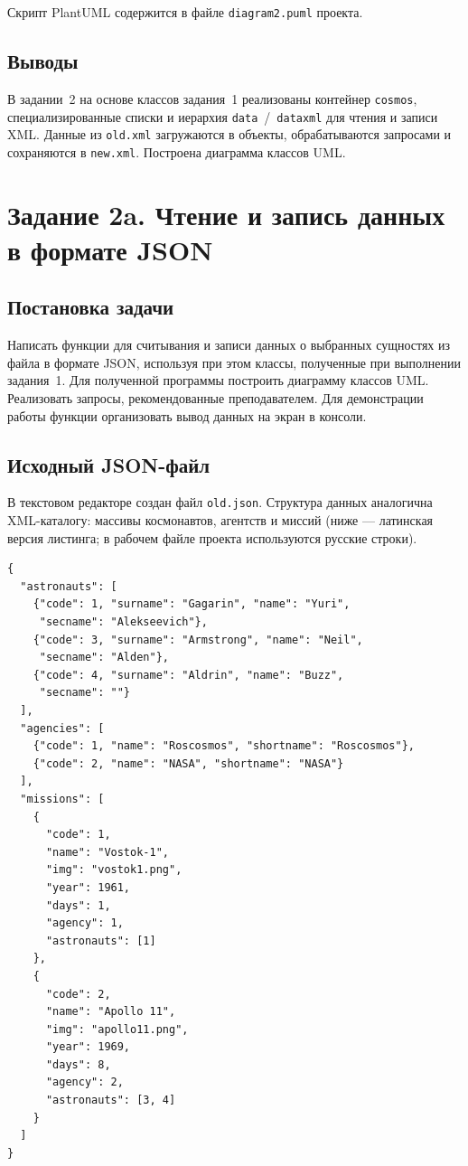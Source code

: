 \documentclass[a4paper,14pt]{extarticle}
\begin{document}
Скрипт PlantUML содержится в файле \texttt{diagram2.puml} проекта.

\subsection{Выводы}

В задании~2 на основе классов задания~1 реализованы контейнер \texttt{cosmos}, специализированные списки и иерархия \texttt{data}~/~\texttt{dataxml} для чтения и записи XML. Данные из \texttt{old.xml} загружаются в объекты, обрабатываются запросами и сохраняются в \texttt{new.xml}. Построена диаграмма классов UML.

\clearpage
\section{Задание 2a. Чтение и запись данных в формате JSON}

\subsection{Постановка задачи}

Написать функции для считывания и записи данных о выбранных сущностях из файла в формате JSON, используя при этом классы, полученные при выполнении задания~1. Для полученной программы построить диаграмму классов UML. Реализовать запросы, рекомендованные преподавателем. Для демонстрации работы функции организовать вывод данных на экран в консоли.

\subsection{Исходный JSON-файл}

В текстовом редакторе создан файл \texttt{old.json}. Структура данных аналогична XML-каталогу: массивы космонавтов, агентств и миссий (ниже --- латинская версия листинга; в рабочем файле проекта используются русские строки).

\begin{lstlisting}[language={},caption={Файл \texttt{old.json} (фрагмент структуры)}]
{
  "astronauts": [
    {"code": 1, "surname": "Gagarin", "name": "Yuri",
     "secname": "Alekseevich"},
    {"code": 3, "surname": "Armstrong", "name": "Neil",
     "secname": "Alden"},
    {"code": 4, "surname": "Aldrin", "name": "Buzz",
     "secname": ""}
  ],
  "agencies": [
    {"code": 1, "name": "Roscosmos", "shortname": "Roscosmos"},
    {"code": 2, "name": "NASA", "shortname": "NASA"}
  ],
  "missions": [
    {
      "code": 1,
      "name": "Vostok-1",
      "img": "vostok1.png",
      "year": 1961,
      "days": 1,
      "agency": 1,
      "astronauts": [1]
    },
    {
      "code": 2,
      "name": "Apollo 11",
      "img": "apollo11.png",
      "year": 1969,
      "days": 8,
      "agency": 2,
      "astronauts": [3, 4]
    }
  ]
}
\end{lstlisting}
\end{document}
